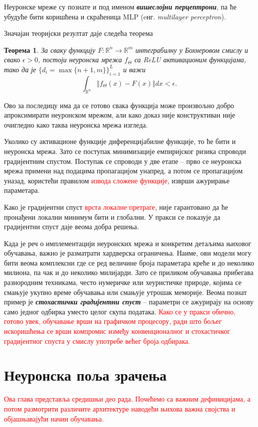 \documentclass[12pt, a4paper, twoside]{book}
\numberwithin{equation}{chapter}
\newtheorem{theorem}{Теорема}
\numberwithin{theorem}{section}
\numberwithin{definition}{section}
\numberwithin{definitionChapter}{chapter}
\begin{document}
Неуронске мреже су познате и под именом \textbf{\textit{вишеслојни перцептрони}}, па ће убудуће бити
коришћена и скраћеница MLP (eнг. \textit{multilayer perceptron}).

Значајан теоријски резултат даје следећа теорема \cite{universal-approx}
\begin{theorem}
	За сваку функцију $F:\mathbb{R}^n \rightarrow \mathbb{R}^m$ интеграбилну у Бохнеровом смислу
	и свако $\epsilon > 0$, постоји неуронска мрежа $f_\Theta$ са ReLU активационим функцијама,
	тако да је $\{d_i=\max\{ n + 1, m\}\}_{i=1}^{L}$ и важи
	$$\int_{\mathbb{R}^n}\left\Vert f_\Theta(x) - F(x) \right\Vert dx < \epsilon.$$
\end{theorem}
Ово за последицу има да се готово свака функција може произвољно добро апроксимирати неуронском
мрежом, али како доказ није конструктиван није очигледно како таква неуронска мрежа изгледа.

Уколико су активационе функције диференцијабилне функције, то ће бити и неуронска мрежа. Зато се
поступак минимизације емпиријског ризика спроводи градијентним спустом. Поступак се спроводи у
две етапе -- прво се неуронска мрежа примени над подацима пропагацијом унапред, а потом се
пропагацијом уназад, користећи правилом \textcolor{red}{извода сложене функције}, изврши ажурирање параметара.

Како је градијентни спуст \textcolor{red}{врста локалне претраге}, није гарантовано да ће пронађени
локални минимум бити и глобални. У пракси се показује да градијентни спуст даје веома добра решења.

Када је реч о имплементацији неуронских мрежа и конкретим детаљима њиховог обучавања, важно је
разматрати хардверска ограничења. Наиме, ови модели могу бити веома комплексни где се ред величине
броја параметара креће и до неколико милиона, па чак и до неколико милијарди. Зато се приликом
обучавања прибегава разнородним техникама, често нумеричке или хеуристичке природе, којима се
смањује укупно време обучавања или смањује утрошак меморије. Веома познат пример је \textbf{\textit{стохастички
градијентни спуст}} \cite{sgd} -- параметри се ажурирају на основу само једног одбирка уместо целог
скупа података. \textcolor{red}{Како се у пракси обично, готово увек, обучавање врши на графичком процесору, ради што бољег
искоришћења се врши компромис између конвенционалног и стохастичког градијентног спуста у смислу употребе
већег броја одбирака.}

\chapter{Неуронска поља зрачења}
\textcolor{red}{Ова глава представља средишњи део рада. Почећемо са важним дефиницијама, а потом размотрити различите
архитектуре наводећи њихова важна својства и објашњавајући начин обучавања.}
\end{document}
